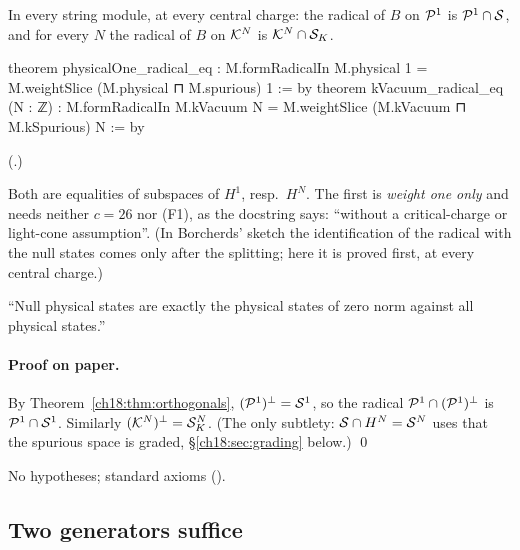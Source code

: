 \begin{theorem}\label{ch18:thm:radicals}
In every string module, at every central charge: the radical of $B$ on $\mathcal{P}^1$ is $\mathcal{P}^1\cap\mathcal{S}$, and for every
$N$ the radical of $B$ on $\mathcal{K}^N$ is $\mathcal{K}^N\cap\mathcal{S}_K$.
\end{theorem}
\begin{leancode}
theorem physicalOne_radical_eq :
    M.formRadicalIn M.physical 1 = M.weightSlice (M.physical ⊓ M.spurious) 1 := by
theorem kVacuum_radical_eq (N : ℤ) :
    M.formRadicalIn M.kVacuum N = M.weightSlice (M.kVacuum ⊓ M.kSpurious) N := by
\end{leancode}
(.)
\begin{dictionary}
Both are equalities of subspaces of $H^1$, resp.\ $H^N$.  The first is \emph{weight one only} and
needs neither $c=26$ nor (F1), as the docstring says: ``without a critical-charge or light-cone
assumption''.  (In Borcherds' sketch the identification of the radical with the null states comes only after the
splitting; here it is proved first, at every central charge.)
\end{dictionary}
\begin{physics}
``Null physical states are exactly the physical states of zero norm against all physical states.''
\end{physics}
\paragraph{Proof on paper.}  By Theorem~\ref{ch18:thm:orthogonals}, $(\mathcal{P}^1)^\perp=\mathcal{S}^1$, so the radical
$\mathcal{P}^1\cap(\mathcal{P}^1)^\perp$ is $\mathcal{P}^1\cap\mathcal{S}^1$.  Similarly $(\mathcal{K}^N)^\perp=\mathcal{S}_K^N$.  (The only subtlety: $\mathcal{S}\cap H^N=\mathcal{S}^N$
uses that the spurious space is graded, \S\ref{ch18:sec:grading} below.) \qed
\begin{status}
No hypotheses; standard axioms ().
\end{status}

\subsection{Two generators suffice}

